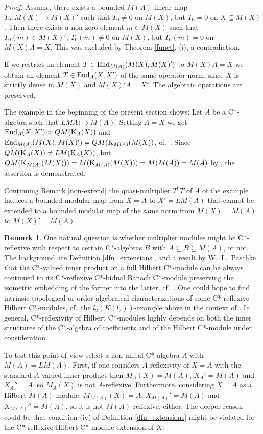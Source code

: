 \documentclass{amsart}
\theoremstyle{definition}
\newtheorem{rmk}[thm]{Remark}
\begin{document}
\begin{proof}
Assume, there exists a bounded $M(A)$-linear map $T_0: M(X) \to M(X)'$ such that  $T_0 \neq 0$ on $M(X)$, but $T_0 =0$ on $X \subseteq M(X)$. Then there exists a non-zero element $m \in M(X)$ such that $T_0(m) \in M(X)'$,  $T_0(m) \neq 0$ on $M(X)$, but $T_0(m) = 0$ on $M(X)A = X$. This was excluded by Theorem \ref{funct}, (i), a contradiction. 

If we restrict an element $T \in {\rm End}_{M(A)}(M(X),M(X)')$ to $M(X)A = X$ we obtain an element $T \in {\rm End}_A(X,X')$ of the same operator norm, since $X$ is strictly dense in $M(X)$ and $M(X)'A = X'$. The algebraic operations are preserved. 

The example in the beginning of the present section shows: Let $A$ be a C*-algebra such that $LMA) \supset M(A)$. Setting $A=X$ we get ${\rm End}_A(X,X') = QM({\rm K}_A(X))$ and ${\rm End}_{M(A)}(M(X),M(X)') = QM({\rm K}_{M(A)}(M(X))$, cf.~\cite[Thm.~1.6]{Lin_1991}.  Since $QM({\rm K}_A(X)) \not= LM({\rm K}_A(X))$, but $QM({\rm K}_{M(A)}(M(X))) = M({\rm K}_{M(A)}(M(X))) = M(M(A)) = M(A)$ by \cite[Cor.~4.18]{Brown}, the assertion is demonstrated.
\end{proof}

Continuing Remark \ref{non-extend} the quasi-multiplier $T^*T$ of $A$ of the example induces a bounded modular map from $X=A$ to $X'=LM(A)$ that cannot be extended to a bounded modular map of the same norm from $M(X)=M(A)$ to $M(X)'=M(A)$.

\begin{rmk}
One natural question is whether multiplier modules might be C*-reflexive with respect to certain C*-algebras $B$ with $A \subseteq B \subseteq M(A)$, or not. The background are Definition \ref{dfn_extensions}, and a result by W.~L.~Paschke that the C*-valued inner product on a full Hilbert C*-module can be always continued to its C*-reflexive C*-bidual Banach C*-module preserving the isometric embedding of the former into the latter, cf.~\cite{Paschke_1974}. One could hope to find intrinsic topological or order-algebraical characterizations of some C*-reflexive Hilbert C*-modules, cf.~the $l_2(K(l_2))$-example above in the context of \cite{Paschke}. In general, C*-reflexivity of Hilbert C*-modules highly depends on both the inner structures of the C*-algebra of coefficients and of the Hilbert C*-module under consideration.

To test this point of view select a non-unital C*-algebra $A$ with $M(A)=LM(A)$. First, if one considers $A$-reflexivity of $X=A$ with the standard $A$-valued inner product then $M_A(X) = M(A)$, $X_A'=M(A)$ and $X_A'' = A$, so $M_A(X)$ is not $A$-reflexive. Furthermore, considering $X=A$ as a Hilbert $M(A)$-module, $M_{M(A)}(X)= A$, $X_{M(A)}'=M(A)$ and $X_{M(A)}'' = M(A)$, so it is not $M(A)$-reflexive, either. The deeper reason could be that condition (iv) of Definition \ref{dfn_extensions} might be violated for the C*-reflexive Hilbert C*-module extension of $X$.
\end{rmk}
\end{document}
